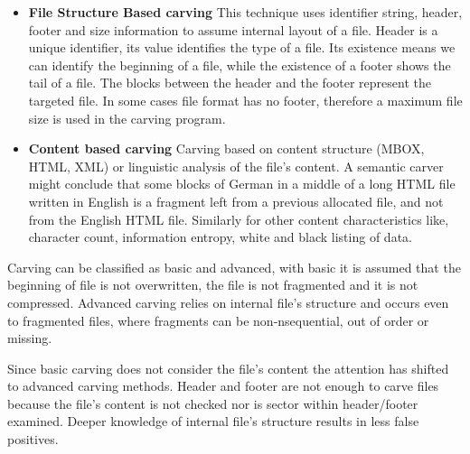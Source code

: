 \documentclass{acm_proc_article-sp}
\begin{document}
\begin{itemize}
\item \textbf{File Structure Based carving}
This technique uses identifier string, header, footer and size information to assume internal layout of a file. Header is a unique identifier, its value identifies the type of a file. Its existence means we can identify the beginning of a file, while the existence of a footer shows the tail of a file.
The blocks between the header and the footer represent the targeted file. In some cases file format has no footer, therefore a maximum file size is used in the carving program.
\item \textbf{Content based carving}
Carving based on content structure (MBOX, HTML, XML) or linguistic analysis of the file's content. A semantic carver might conclude that some blocks of German in a middle of a long HTML file written in English is a fragment left from a previous allocated file, and not from the English HTML file. Similarly for other content characteristics like, character count, information entropy, white and black listing of data.
\end{itemize}
Carving can be classified as basic and advanced, with basic it is assumed that the beginning of file is not overwritten, the file is not fragmented and it is not compressed. Advanced carving relies on internal file's structure and occurs even to fragmented files, where fragments can be non-nsequential, out of order or missing.

Since basic carving does not consider the file's content the  attention has shifted to  advanced  carving methods. Header and footer are not enough to carve files because the file's content is not checked nor is sector within header/footer examined. Deeper knowledge of internal file's structure results in less false positives. 
\end{document}

